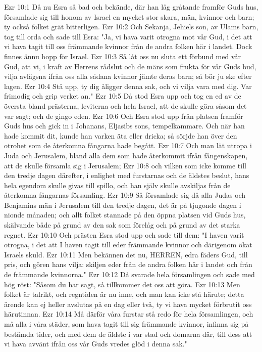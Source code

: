 Ezr 10:1  Då nu Esra så bad och bekände, där han låg gråtande framför Guds hus, församlade sig till honom av Israel en mycket stor skara, män, kvinnor och barn; ty också folket grät bitterligen.
Ezr 10:2  Och Sekanja, Jehiels son, av Ulams barn, tog till orda och sade till Esra: "Ja, vi hava varit otrogna mot vår Gud, i det att vi hava tagit till oss främmande kvinnor från de andra folken här i landet. Dock finnes ännu hopp för Israel.
Ezr 10:3  Så låt oss nu sluta ett förbund med vår Gud, att vi, i kraft av Herrens rådslut och de mäns som frukta för vår Guds bud, vilja avlägsna ifrån oss alla sådana kvinnor jämte deras barn; så bör ju ske efter lagen.
Ezr 10:4  Stå upp, ty dig åligger denna sak, och vi vilja vara med dig. Var frimodig och grip verket an."
Ezr 10:5  Då stod Esra upp och tog en ed av de översta bland prästerna, leviterna och hela Israel, att de skulle göra såsom det var sagt; och de gingo eden.
Ezr 10:6  Och Esra stod upp från platsen framför Guds hus och gick in i Johanans, Eljasibs sons, tempelkammare. Och när han hade kommit dit, kunde han varken äta eller dricka; så sörjde han över den otrohet som de återkomna fångarna hade begått.
Ezr 10:7  Och man lät utropa i Juda och Jerusalem, bland alla dem som hade återkommit ifrån fångenskapen, att de skulle församla sig i Jerusalem;
Ezr 10:8  och vilken som icke komme till den tredje dagen därefter, i enlighet med furstarnas och de äldstes beslut, hans hela egendom skulle givas till spillo, och han själv skulle avskiljas från de återkomna fångarnas församling.
Ezr 10:9  Så församlade sig då alla Judas och Benjamins män i Jerusalem till den tredje dagen, det är på tjugonde dagen i nionde månaden; och allt folket stannade på den öppna platsen vid Guds hus, skälvande både på grund av den sak som förelåg och på grund av det starka regnet.
Ezr 10:10  Och prästen Esra stod upp och sade till dem: "I haven varit otrogna, i det att I haven tagit till eder främmande kvinnor och därigenom ökat Israels skuld.
Ezr 10:11  Men bekännen det nu, HERREN, edra fäders Gud, till pris, och gören hans vilja: skiljen eder från de andra folken här i landet och från de främmande kvinnorna."
Ezr 10:12  Då svarade hela församlingen och sade med hög röst: "Såsom du har sagt, så tillkommer det oss att göra.
Ezr 10:13  Men folket är talrikt, och regntiden är nu inne, och man kan icke stå härute; detta ärende kan ej heller avslutas på en dag eller två, ty vi hava mycket förbrutit oss härutinnan.
Ezr 10:14  Må därför våra furstar stå redo för hela församlingen, och må alla i våra städer, som hava tagit till sig främmande kvinnor, infinna sig på bestämda tider, och med dem de äldste i var stad och domarna där, till dess att vi hava avvänt ifrån oss vår Guds vredes glöd i denna sak."

